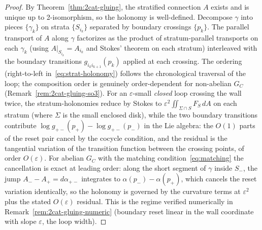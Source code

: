 \documentclass[11pt,a4paper]{article}
\theoremstyle{plain}
\theoremstyle{definition}
\theoremstyle{remark}
\begin{document}
\begin{proof}
By Theorem~\ref{thm:2cat-gluing}, the stratified connection $A$ exists
and is unique up to 2-isomorphism, so the holonomy is well-defined.
Decompose $\gamma$ into pieces $\{\gamma_k\}$ on strata $\{S_{i_k}\}$
separated by boundary crossings $\{p_k\}$. The parallel transport
of $A$ along $\gamma$ factorizes as the product of stratum-parallel
transports on each $\gamma_k$ (using $A|_{S_{i_k}} = A_{i_k}$ and
Stokes' theorem on each stratum) interleaved with the boundary
transitions $g_{i_k i_{k+1}}(p_k)$ applied at each crossing. The
ordering (right-to-left in~\eqref{eq:strat-holonomy}) follows the
chronological traversal of the loop; the composition order is
genuinely order-dependent for non-abelian $G_C$
(Remark~\ref{rem:2cat-gluing-so3}). For an $\varepsilon$-small
\emph{closed} loop crossing the wall twice, the
stratum-holonomies reduce by Stokes to $\varepsilon^2 \iint_{\Sigma
\cap S} F_S\, dA$ on each stratum (where $\Sigma$ is the small
enclosed disk), while the two boundary transitions contribute
$\log g_{+-}(p_+) - \log g_{+-}(p_-)$ in the Lie algebra: the
$O(1)$ parts of the reset pair cancel by the cocycle condition, and
the residual is the tangential variation of the transition function
between the crossing points, of order $O(\varepsilon)$. For abelian
$G_C$ with the matching condition~\eqref{eq:matching} the
cancellation is exact at leading order: along the short segment of
$\gamma$ inside $S_-$, the jump $A_- - A_+ = d\alpha_{+-}$ integrates
to $\alpha(p_-) - \alpha(p_+)$, which cancels the reset variation
identically, so the holonomy is governed by the curvature terms at
$\varepsilon^2$ plus the stated $O(\varepsilon)$ residual. This is
the regime verified numerically in
Remark~\ref{rem:2cat-gluing-numeric} (boundary reset linear in the
wall coordinate with slope $\varepsilon$, the loop width).
\end{proof}
\end{document}
